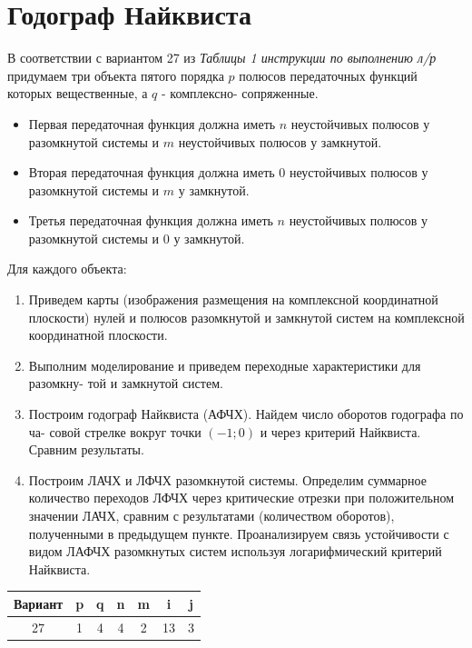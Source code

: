 \section{Годограф Найквиста }

В соответствии с вариантом 27 из \textit{Таблицы 1 инструкции по выполнению л/р} придумаем три объекта пятого
порядка $p$ полюсов передаточных функций которых вещественные, а $q$ - комплексно-
сопряженные.
\begin{itemize}
    \item Первая передаточная функция должна иметь $n$ неустойчивых полюсов у разомкнутой системы и $m$ неустойчивых полюсов у замкнутой.
    \item Вторая передаточная функция должна иметь $0$ неустойчивых полюсов у разомкнутой системы и $m$ у замкнутой.
    \item Третья передаточная функция должна иметь $n$ неустойчивых полюсов у разомкнутой системы и $0$ у замкнутой.
\end{itemize}
Для каждого объекта:
\begin{enumerate}
    \item Приведем карты (изображения размещения на комплексной координатной плоскости) нулей и полюсов разомкнутой и замкнутой систем на комплексной координатной плоскости.
    \item Выполним моделирование и приведем переходные характеристики для разомкну-
    той и замкнутой систем.
    \item Построим годограф Найквиста (АФЧХ). Найдем число оборотов годографа по ча-
    совой стрелке вокруг точки $(-1; 0)$ и через критерий Найквиста. Сравним результаты.
    \item Построим ЛАЧХ и ЛФЧХ разомкнутой системы. Определим суммарное количество переходов ЛФЧХ через критические отрезки при положительном значении
    ЛАЧХ, сравним с результатами (количеством оборотов), полученными в предыдущем пункте. Проанализируем связь устойчивости с видом ЛАФЧХ разомкнутых систем используя логарифмический критерий Найквиста.
\end{enumerate}

\begin{table}[h]
\centering
\begin{tabular}{|c|c|c|c|c|c|c|}
\hline
\textbf{Вариант} & \textbf{p} & \textbf{q} & \textbf{n} & \textbf{m} & \textbf{i} & \textbf{j} \\ \hline
27 & 1 & 4 & 4 & 2 & 13 & 3 \\ \hline
\end{tabular}
\end{table}

